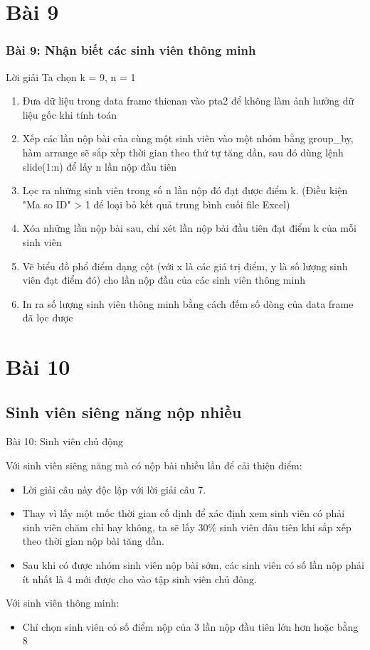 \documentclass[english,10pt,table]{beamer}
\begin{document}
\section{Bài 9}
\frame
{
    \frametitle{Bài 9: Nhận biết các sinh viên thông minh}
    \begin{block}{Lời giải}
    Ta chọn k = 9, n = 1
\begin{enumerate}
    \item  Đưa dữ liệu trong data frame thienan vào pta2 để không làm ảnh hưởng dữ liệu gốc khi tính toán
    \item  Xếp các lần nộp bài của cùng một sinh viên vào một nhóm bằng group\_by, hàm arrange sẽ sắp xếp thời gian theo thứ tự tăng dần, sau đó dùng lệnh slide(1:n) để lấy n lần nộp đầu tiên
    \item  Lọc ra những sinh viên trong số n lần nộp đó đạt được điểm k. (Điều kiện "Ma so ID" > 1 để loại bỏ kết quả trung bình cuối file Excel)
    \item  Xóa những lần nộp bài sau, chỉ xét lần nộp bài đầu tiên đạt điểm k của mỗi sinh viên
    \item  Vẽ biểu đồ phổ điểm dạng cột (với x là các giá trị điểm, y là số lượng sinh viên đạt điểm đó) cho lần nộp đầu của các sinh viên thông minh
    \item  In ra số lượng sinh viên thông minh bằng cách đếm số dòng của data frame đã lọc được
\end{enumerate}
\end{block}
}
\section{Bài 10}
\subsection{Sinh viên siêng năng nộp nhiều}
\begin{frame}{Bài 10: Sinh viên chủ động}
    \begin{block}{Với sinh viên siêng năng mà có nộp bài nhiều
lần để cải thiện điểm:}
        \begin{itemize}
            \item Lời giải câu  này độc lập với lời giải câu 7.
            \item Thay vì  lấy một mốc thời gian cố dịnh để xác định xem sinh viên có phải sinh viên chăm chỉ hay không, ta sẽ lấy 30\% sinh viên đâu tiên khi sắp xếp theo thời gian nộp bài tăng dần.
            \item Sau khi có được nhóm sinh viên nộp bài sớm, các sinh viên có số lần nộp phải ít nhất là 4 mới được cho vào tập sinh viên chủ đông.
        \end{itemize}
    \end{block}
    \begin{block}{Với sinh viên thông minh:}
        \begin{itemize}
             \item Chỉ chọn sinh viên có số điểm nộp của 3 lần nộp đầu tiên lớn hơn hoặc bằng 8
        \end{itemize}
    \end{block}
\end{frame}
\end{document}
